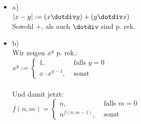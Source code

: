 \documentclass[a4paper]{scrartcl}%
\begin{document}
    \begin{itemize}
        \item a)\\
            $|x-y| := (x \dotdiv y) + (y \dotdiv x)$\\
            Sowohl +, als auch $\dotdiv$ sind p. rek.\\
        \item b)\\
            Wir zeigen $x^y$ p. rek.:\\
            $x^y := \begin{cases}
                        1, &\text{ falls }y=0\\
                        x \cdot x^{y-1}, &\text{ sonst }
                    \end{cases}$\\
            \\Und damit jetzt:\\
            $f(n,m) = \begin{cases}
                n, &\text{ falls }m=0\\
                n^{f(n,m-1)}, &\text{ sonst}
            \end{cases}$\\

    \end{itemize}

    
\end{document}
